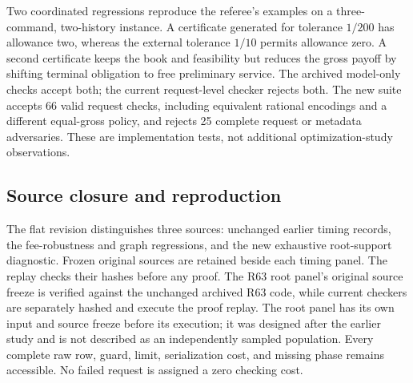 \documentclass[11pt,letterpaper]{article}
\theoremstyle{definition}\newtheorem{remark}[theorem]{Remark}
\begin{document}
Two coordinated regressions reproduce the referee's examples on a three-command, two-history instance. A certificate generated for tolerance $1/200$ has allowance two, whereas the external tolerance $1/10$ permits allowance zero. A second certificate keeps the book and feasibility but reduces the gross payoff by shifting terminal obligation to free preliminary service. The archived model-only checks accept both; the current request-level checker rejects both. The new suite accepts 66 valid request checks, including equivalent rational encodings and a different equal-gross policy, and rejects 25 complete request or metadata adversaries. These are implementation tests, not additional optimization-study observations.

\subsection{Source closure and reproduction}
The flat revision distinguishes three sources: unchanged earlier timing records, the fee-robustness and graph regressions, and the new exhaustive root-support diagnostic. Frozen original sources are retained beside each timing panel. The replay checks their hashes before any proof. The R63 root panel's original source freeze is verified against the unchanged archived R63 code, while current checkers are separately hashed and execute the proof replay. The root panel has its own input and source freeze before its execution; it was designed after the earlier study and is not described as an independently sampled population. Every complete raw row, guard, limit, serialization cost, and missing phase remains accessible. No failed request is assigned a zero checking cost.
\end{document}
